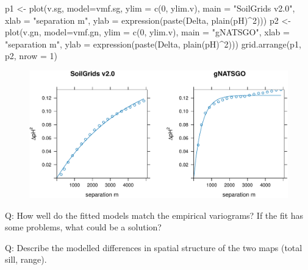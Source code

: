 \documentclass[
  letterpaper,
  DIV=11,
  numbers=noendperiod]{scrartcl}
\newenvironment{Shaded}{\begin{snugshade}}{\end{snugshade}}
\newcommand{\AttributeTok}[1]{\textcolor[rgb]{0.40,0.45,0.13}{#1}}
\newcommand{\DecValTok}[1]{\textcolor[rgb]{0.68,0.00,0.00}{#1}}
\newcommand{\FunctionTok}[1]{\textcolor[rgb]{0.28,0.35,0.67}{#1}}
\newcommand{\NormalTok}[1]{\textcolor[rgb]{0.00,0.23,0.31}{#1}}
\newcommand{\OtherTok}[1]{\textcolor[rgb]{0.00,0.23,0.31}{#1}}
\newcommand{\SpecialCharTok}[1]{\textcolor[rgb]{0.37,0.37,0.37}{#1}}
\newcommand{\StringTok}[1]{\textcolor[rgb]{0.13,0.47,0.30}{#1}}
\begin{document}
\begin{Shaded}
\begin{Highlighting}[]
\NormalTok{p1 }\OtherTok{\textless{}{-}} \FunctionTok{plot}\NormalTok{(v.sg, }\AttributeTok{model=}\NormalTok{vmf.sg, }\AttributeTok{ylim =} \FunctionTok{c}\NormalTok{(}\DecValTok{0}\NormalTok{, ylim.v), }\AttributeTok{main =} \StringTok{"SoilGrids v2.0"}\NormalTok{, }
     \AttributeTok{xlab =} \StringTok{"separation m"}\NormalTok{, }\AttributeTok{ylab =} \FunctionTok{expression}\NormalTok{(}\FunctionTok{paste}\NormalTok{(Delta, }\FunctionTok{plain}\NormalTok{(pH)}\SpecialCharTok{\^{}}\DecValTok{2}\NormalTok{)))}
\NormalTok{p2 }\OtherTok{\textless{}{-}} \FunctionTok{plot}\NormalTok{(v.gn, }\AttributeTok{model=}\NormalTok{vmf.gn, }\AttributeTok{ylim =} \FunctionTok{c}\NormalTok{(}\DecValTok{0}\NormalTok{, ylim.v), }\AttributeTok{main =} \StringTok{"gNATSGO"}\NormalTok{, }
     \AttributeTok{xlab =} \StringTok{"separation m"}\NormalTok{, }\AttributeTok{ylab =} \FunctionTok{expression}\NormalTok{(}\FunctionTok{paste}\NormalTok{(Delta, }\FunctionTok{plain}\NormalTok{(pH)}\SpecialCharTok{\^{}}\DecValTok{2}\NormalTok{)))}
\FunctionTok{grid.arrange}\NormalTok{(p1, p2, }\AttributeTok{nrow =} \DecValTok{1}\NormalTok{)}
\end{Highlighting}
\end{Shaded}

\begin{figure}[H]

{\centering \includegraphics{PatternAnalysisWorkshopTutorial_files/figure-pdf/fitted_variogram_model-1.pdf}

}

\end{figure}

Q: How well do the fitted models match the empirical variograms? If the
fit has some problems, what could be a solution?

Q: Describe the modelled differences in spatial structure of the two
maps (total sill, range).
\end{document}
